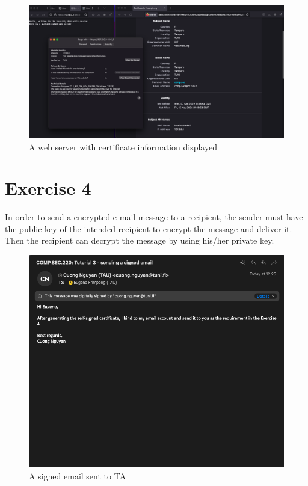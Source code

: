\documentclass{article}
\begin{document}
%
\begin{figure}[hpt]
    \centering
    \includegraphics[width=\textwidth,height=\textheight,keepaspectratio]{cert.png}
    \caption{A web server with certificate information displayed}
    \label{fig:cert}
\end{figure}

\section*{Exercise 4}
%
In order to send a encrypted e-mail message to a recipient, the sender must have
the public key of the intended recipient to encrypt the message and deliver it.
Then the recipient can decrypt the message by using his/her private key.

\begin{figure}
    \centering
    \includegraphics[height=\textheight, width=\textwidth, keepaspectratio]{signed_email.png}
    \caption{A signed email sent to TA}
\end{figure}
\end{document}
